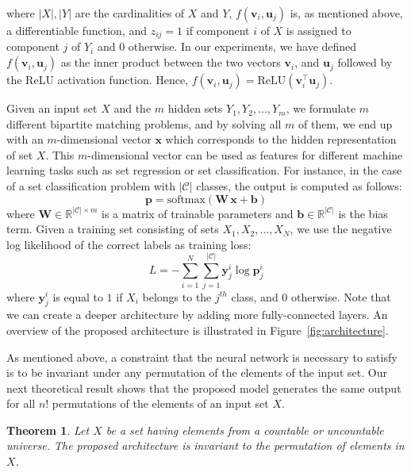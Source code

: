 \documentclass[twoside]{article}
\newtheorem{theorem}{Theorem}
\begin{document}
where $|X|,|Y|$ are the cardinalities of $X$ and $Y$, $f(\mathbf{v}_i, \mathbf{u}_j)$ is, as mentioned above, a differentiable function, and $z_{ij}=1$ if component $i$ of $X$ is assigned to component $j$ of $Y_i$ and $0$ otherwise.
In our experiments, we have defined $f(\mathbf{v}_i, \mathbf{u}_j)$ as the inner product between the two vectors $\mathbf{v}_i$, and $\mathbf{u}_j$ followed by the ReLU activation function.
Hence, $f(\mathbf{v}_i, \mathbf{u}_j) = \text{ReLU}(\mathbf{v}_i^\top \mathbf{u}_j)$.

Given an input set $X$ and the $m$ hidden sets $Y_1, Y_2, \ldots, Y_m$, we formulate $m$ different bipartite matching problems, and by solving all $m$ of them, we end up with an $m$-dimensional vector $\mathbf{x}$ which corresponds to the hidden representation of set $X$.
This $m$-dimensional vector can be used as features for different machine learning tasks such as set regression or set classification.
For instance, in the case of a set classification problem with $|\mathcal{C}|$ classes, the output is computed as follows:
\begin{equation*}
    \mathbf{p} = \text{softmax}(\mathbf{W} \, \mathbf{x} + \mathbf{b})
\end{equation*}
where $\mathbf{W} \in \mathbb{R}^{|\mathcal{C}| \times m}$ is a matrix of trainable parameters and $\mathbf{b} \in \mathbb{R}^{|\mathcal{C}|}$ is the bias term.
Given a training set consisting of sets $X_1, X_2, \ldots, X_N$, we use the negative log likelihood of the correct labels as training loss:
\begin{equation*}
    L = -\sum_{i=1}^N \sum_{j=1}^{|\mathcal{C}|} \mathbf{y}_j^i \log \mathbf{p}_j^i
\label{eq:loss_function}    
\end{equation*}
where $\mathbf{y}_j^i$ is equal to $1$ if $X_i$ belongs to the $j^{th}$ class, and $0$ otherwise.
Note that we can create a deeper architecture by adding more fully-connected layers.
An overview of the proposed architecture is illustrated in Figure~\ref{fig:architecture}.

As mentioned above, a constraint that the neural network is necessary to satisfy is to be invariant under any permutation of the elements of the input set.
Our next theoretical result shows that the proposed model generates the same output for all $n!$ permutations of the elements of an input set $X$.
\begin{theorem}
    Let $X$ be a set having elements from a countable or uncountable universe.
    The proposed architecture is invariant to the permutation of elements in $X$.
\end{theorem}
\end{document}
